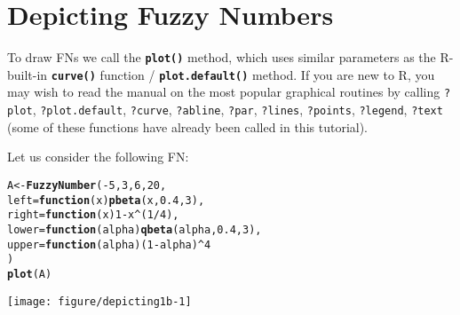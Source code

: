 \documentclass[11pt]{article}\usepackage[]{graphicx}\usepackage[]{color}
\makeatletter
\newcommand{\hlnum}[1]{\textcolor[rgb]{0.686,0.059,0.569}{#1}}%
\newcommand{\hlopt}[1]{\textcolor[rgb]{0,0,0}{#1}}%
\newcommand{\hlstd}[1]{\textcolor[rgb]{0.345,0.345,0.345}{#1}}%
\newcommand{\hlkwa}[1]{\textcolor[rgb]{0.161,0.373,0.58}{\textbf{#1}}}%
\newcommand{\hlkwb}[1]{\textcolor[rgb]{0.69,0.353,0.396}{#1}}%
\newcommand{\hlkwc}[1]{\textcolor[rgb]{0.333,0.667,0.333}{#1}}%
\newcommand{\hlkwd}[1]{\textcolor[rgb]{0.737,0.353,0.396}{\textbf{#1}}}%
\newenvironment{kframe}{%
 \def\at@end@of@kframe{}%
 \ifinner\ifhmode%
  \def\at@end@of@kframe{\end{minipage}}%
  \begin{minipage}{\columnwidth}%
 \fi\fi%
 \def\FrameCommand##1{\hskip\@totalleftmargin \hskip-\fboxsep
 \colorbox{shadecolor}{##1}\hskip-\fboxsep
     \hskip-\linewidth \hskip-\@totalleftmargin \hskip\columnwidth}%
 \MakeFramed {\advance\hsize-\width
   \@totalleftmargin\z@ \linewidth\hsize
   \@setminipage}}%
 {\par\unskip\endMakeFramed%
 \at@end@of@kframe}
\newenvironment{knitrout}{}{} %
\newcommand{\lang}[1]{\textsf{#1}\xspace}
\newcommand{\R}{\lang{R}}
\newcommand{\func}[1]{\texttt{\hlkwd{#1}}}
\makeatother
\begin{document}




\section{Depicting Fuzzy Numbers}\label{Sec:Depicting}


To draw FNs we call the \func{plot()} method,
which uses similar parameters as the \R-built-in
\func{curve()} function / \func{plot.default()} method.
If you are new to \R, you may wish
to read the manual on the most popular graphical routines by
calling \texttt{?plot}, \texttt{?plot.default}, \texttt{?curve},
\texttt{?abline}, \texttt{?par}, \texttt{?lines}, \texttt{?points},
\texttt{?legend}, \texttt{?text} (some of these functions have
already been called in this tutorial).

Let us consider the following FN:

\begin{knitrout}\small
{}\color{fgcolor}\begin{kframe}
\begin{alltt}
\hlstd{A} \hlkwb{<-} \hlkwd{FuzzyNumber}\hlstd{(}\hlopt{-}\hlnum{5}\hlstd{,} \hlnum{3}\hlstd{,} \hlnum{6}\hlstd{,} \hlnum{20}\hlstd{,}
    \hlkwc{left}\hlstd{=}\hlkwa{function}\hlstd{(}\hlkwc{x}\hlstd{)} \hlkwd{pbeta}\hlstd{(x,}\hlnum{0.4}\hlstd{,}\hlnum{3}\hlstd{),}
   \hlkwc{right}\hlstd{=}\hlkwa{function}\hlstd{(}\hlkwc{x}\hlstd{)} \hlnum{1}\hlopt{-}\hlstd{x}\hlopt{^}\hlstd{(}\hlnum{1}\hlopt{/}\hlnum{4}\hlstd{),}
   \hlkwc{lower}\hlstd{=}\hlkwa{function}\hlstd{(}\hlkwc{alpha}\hlstd{)} \hlkwd{qbeta}\hlstd{(alpha,}\hlnum{0.4}\hlstd{,}\hlnum{3}\hlstd{),}
   \hlkwc{upper}\hlstd{=}\hlkwa{function}\hlstd{(}\hlkwc{alpha}\hlstd{) (}\hlnum{1}\hlopt{-}\hlstd{alpha)}\hlopt{^}\hlnum{4}
\hlstd{)}
\hlkwd{plot}\hlstd{(A)}
\end{alltt}
\end{kframe}
\end{knitrout}

\begin{center}
\begin{knitrout}\small
{}\color{fgcolor}

{\centering \texttt{[image: figure/depicting1b-1]} 

}



\end{knitrout}
\end{center}
\end{document}
